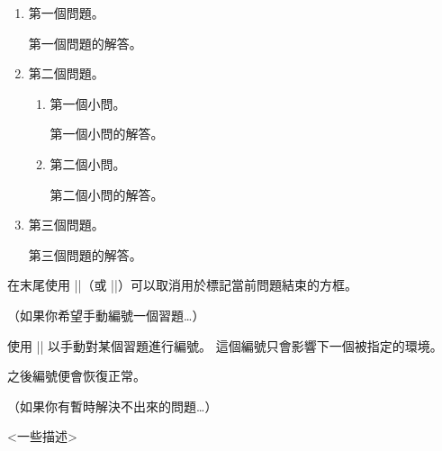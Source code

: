 \documentclass[11pt,
  logo = {example-image},
  title in boldface,
  theorem in new line,
  colored solution,
]{homework}
\begin{document}
\begin{problem}[一個由許多小問題構成的大問題]
    \begin{enumerate}
        \item 第一個問題。

        \begin{solution}
            第一個問題的解答。
        \end{solution}

        \item 第二個問題。

        \begin{enumerate}
            \item 第一個小問。

            \begin{solution}
                第一個小問的解答。
            \end{solution}

            \item 第二個小問。

            \begin{solution}
                第二個小問的解答。
            \end{solution}

        \end{enumerate}

        \item 第三個問題。

        \begin{solution}
            第三個問題的解答。
        \end{solution}

    \end{enumerate}
    在末尾使用 \cverb|\noqed|（或 \cverb|\noQED|）可以取消用於標記當前問題結束的方框。
    \noQED
\end{problem}


\bigskip\textcolor{gray!55}{（如果你希望手動編號一個習題…）}

\begin{exercise}[一個手動編號的習題]
    使用 \cverb|\ManualNumbering| 以手動對某個習題進行編號。 這個編號只會影響下一個被指定的環境。
\end{exercise}

\begin{exercise}
    之後編號便會恢復正常。
\end{exercise}


\bigskip\textcolor{gray!55}{（如果你有暫時解決不出來的問題…）}

\DNF<一些描述>
\end{document}
